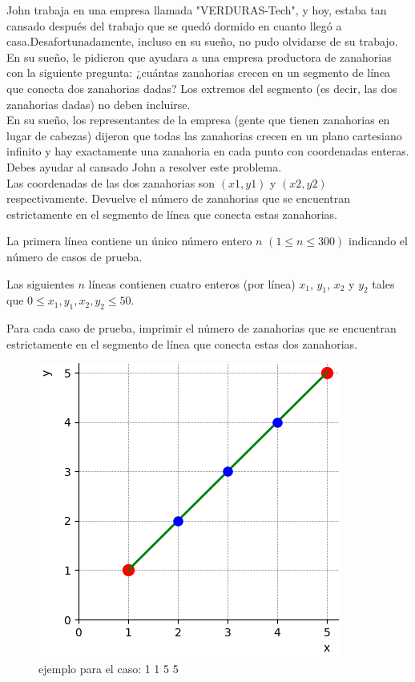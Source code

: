 
John trabaja en una empresa llamada "VERDURAS-Tech", y hoy, estaba tan cansado después del trabajo que se quedó dormido en cuanto llegó a casa.Desafortunadamente, incluso en su sueño, no pudo olvidarse de su trabajo. En su sueño, le pidieron que ayudara a una empresa productora de zanahorias con la siguiente pregunta: ¿cuántas zanahorias crecen en un segmento de línea que conecta dos zanahorias dadas? Los extremos del segmento (es decir, las dos zanahorias dadas) no deben incluirse.\\

En su sueño, los representantes de la empresa (gente que tienen zanahorias en lugar de cabezas) dijeron que todas las zanahorias crecen en un plano cartesiano infinito y hay exactamente una zanahoria en cada punto con coordenadas enteras. Debes ayudar al cansado John a resolver este problema.\\

Las coordenadas de las dos zanahorias son $(x1, y1)$ y $(x2, y2)$ respectivamente. Devuelve el número de zanahorias que se encuentran estrictamente en el segmento de línea que conecta estas zanahorias.


La primera línea contiene un único número entero $n$ $(1 \le n \le 300)$ indicando el número de casos de prueba.

Las siguientes $n$ líneas contienen cuatro enteros (por línea) $x_1$, $y_1$, $x_2$ y $y_2$ tales que $0 \leq x_1, y_1, x_2, y_2 \leq 50$.

\outputText

Para cada caso de prueba, imprimir el número de zanahorias que se encuentran estrictamente en el segmento de línea que conecta estas dos zanahorias.

\begin{figure}[h]
  \centering
  \caption{ejemplo para el caso: 1 1 5 5}
  \includegraphics[scale=.5]{2024/Zanahorias/images/zanahorias.png}
\end{figure}

